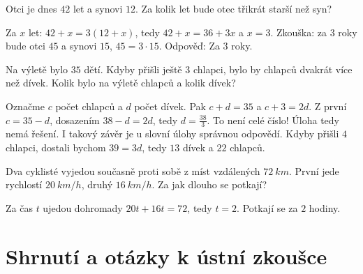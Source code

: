 \begin{problem}
  Otci je dnes $42$ let a synovi $12$. Za kolik let bude otec třikrát starší než syn?
\end{problem}

\begin{solution}
  Za $x$ let: $42 + x = 3(12 + x)$, tedy $42 + x = 36 + 3x$ a $x = 3$. Zkouška: za $3$ roky bude otci $45$ a synovi $15$, $45 = 3\cdot 15$. Odpověď: Za $3$ roky.
\end{solution}

\begin{problem}
  Na výletě bylo $35$ dětí. Kdyby přišli ještě $3$ chlapci, bylo by chlapců dvakrát více než dívek. Kolik bylo na výletě chlapců a kolik dívek?
\end{problem}

\begin{solution}
  Označme $c$ počet chlapců a $d$ počet dívek. Pak $c + d = 35$ a $c + 3 = 2d$. Z první $c = 35 - d$, dosazením $38 - d = 2d$, tedy $d = \frac{38}{3}$. To není celé číslo! Úloha tedy nemá řešení. I takový závěr je u slovní úlohy správnou odpovědí. Kdyby přišli $4$ chlapci, dostali bychom $39 = 3d$, tedy $13$ dívek a $22$ chlapců.
\end{solution}

\begin{problem}
  Dva cyklisté vyjedou současně proti sobě z míst vzdálených $72\ \si{km}$. První jede rychlostí $20\ \si{km/h}$, druhý $16\ \si{km/h}$. Za jak dlouho se potkají?
\end{problem}

\begin{solution}
  Za čas $t$ ujedou dohromady $20t + 16t = 72$, tedy $t = 2$. Potkají se za $2$ hodiny.
\end{solution}

\section{Shrnutí a otázky k ústní zkoušce}

